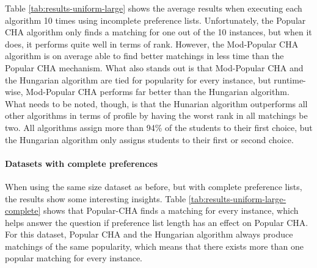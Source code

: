 \begin{table}[h!]
  \centering
  \caption{Average results for large uniform dataset with incomplete preferences.}
  \label{tab:results-uniform-large}
\end{table}

Table \ref{tab:results-uniform-large} shows the average results when executing each algorithm 10 times using incomplete preference lists. Unfortunately, the Popular CHA algorithm only finds a matching for one out of the 10 instances, but when it does, it performs quite well in terms of rank. However, the Mod-Popular CHA algorithm is on average able to find better matchings in less time than the Popular CHA mechanism. What also stands out is that Mod-Popular CHA and the Hungarian algorithm are tied for popularity for every instance, but runtime-wise, Mod-Popular CHA performs far better than the Hungarian algorithm. What needs to be noted, though, is that the Hunarian algorithm outperforms all other algorithms in terms of profile by having the worst rank in all matchings be two. All algorithms assign more than 94\% of the students to their first choice, but the Hungarian algorithm only assigns students to their first or second choice.  

\paragraph{Datasets with complete preferences}
When using the same size dataset as before, but with complete preference lists, the results show some interesting insights. Table \ref{tab:results-uniform-large-complete} shows that Popular-CHA finds a matching for every instance, which helps answer the question if preference list length has an effect on Popular CHA. For this dataset, Popular CHA and the Hungarian algorithm always produce matchings of the same popularity, which means that there exists more than one popular matching for every instance. 

